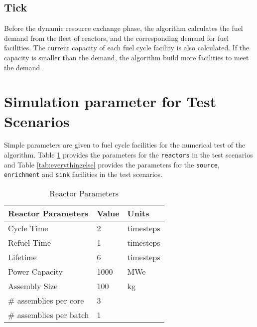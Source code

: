 \documentclass[12pt,letterpaper]{article}
\begin{document}
\subsection{Tick}
Before the dynamic resource exchange phase, the algorithm calculates the fuel demand
from the fleet of reactors, and the corresponding demand for fuel facilities.
The current capacity of each fuel cycle facility is also calculated. If the capacity
is smaller than the demand, the algorithm build more facilities to meet the demand.

 




\section{Simulation parameter for Test Scenarios}
Simple parameters are given to fuel cycle facilities for the numerical test of 
the algorithm.  
Table \ref{tab:reactor} provides the parameters for the \texttt{reactors} in the test scenarios and Table \ref{tab:everythingelse} provides the parameters for the \texttt{source}, \texttt{enrichment} and \texttt{sink} facilities in the test scenarios.

\begin{table}[h]
    \centering
    \begin{tabularx}{\textwidth}{bbb}
       \hline
       Reactor Parameters & Value & Units \\
       \hline
       Cycle Time & 2 & timesteps \\
       Refuel Time & 1 & timesteps \\
       Lifetime & 6 & timesteps \\
       Power Capacity & 1000 & MWe \\
       Assembly Size & 100 & kg \\
       \# assemblies per core & 3 & \\
       \# assemblies per batch & 1 & \\
       \hline
    \end{tabularx}
    \caption {Reactor Parameters}
    \label{tab:reactor}
\end{table}
\end{document}
